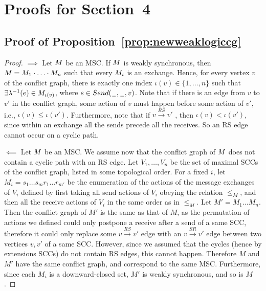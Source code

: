 \documentclass[a4paper,UKenglish,cleveref, autoref, thm-restate]{lipics-v2021}
\begin{document}
\section{Proofs for Section~4}\label{appendix:section4}

\subsection{Proof of Proposition~\ref{prop:newweaklogiccg}}

\newweaklogiccg*

\begin{proof}
	$\implies$ Let $M$ be an MSC. If $M$ is weakly synchronous, then $M = M_1 \cdot \ldots \cdot M_n$ such that every $M_i$ is an exchange. Hence, for every vertex $v$ of the conflict graph, there is exactly one index $\iota(v) \in \{1,\ldots,n\}$ such that $\exists \lambda^{-1}(e) \in M_{\iota(v)}$, where $e \in Send(\hspace{0.1em}\underline{\hspace{0.5em}}\hspace{0.1em}, \hspace{0.1em}\underline{\hspace{0.5em}}\hspace{0.1em}, v)$. Note that if there is an edge from $v$ to $v'$ in the conflict
	graph, some action of $v$ must happen before some action of $v'$, i.e., $\iota(v) \leq \iota (v')$.
	 Furthermore, note that if $v \xrightarrow{RS} v'$ , then $\iota(v) < \iota(v')$, since within an exchange all the sends precede all the receives. So an RS edge cannot occur on a cyclic path.

	$\impliedby$ Let $M$ be an MSC. We assume now that the conflict graph of $M$ does not contain a cyclic path with an RS edge. Let $V_1, \ldots , V_n$ be the set of maximal SCCs of the conflict graph, listed in some
	topological order. For a fixed $i$, let $M_i = s_1 \ldots s_m r_1 \ldots r_{m'}$ be the enumeration of
	the actions of the message exchanges of $V_i$ defined by first taking all send actions
	of $V_i$ obeying the relation $\leq_M$, and then all the receive actions of
	$V_i$ in the same order as in $\leq_M$. Let $M' = M_1 \ldots M_n$. Then the conflict graph of $M'$ is the same as that of $M$, as the permutation of actions we defined could only postpone a receive after a send of a same SCC, therefore it could only replace some $v \xrightarrow{RS} v'$ edge with an $v \xrightarrow{SR} v'$ edge between two vertices $v,v'$ of a same SCC. However, since we assumed that the cycles (hence by extensions SCCs) do not contain RS edges, this cannot happen. Therefore $M$ and $M'$ have the same conflict graph, and correspond to the same MSC. Furthermore, since each $M_i$ is a downward-closed set, $M'$ is weakly synchronous, and so is $M$.
\end{proof}
\end{document}
